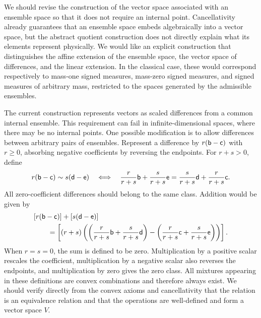 \ifdraft

\openproblembreak

{We should revise the construction of the vector space associated with an ensemble space so that it does not require an internal point. Cancellativity already guarantees that an ensemble space embeds algebraically into a vector space, but the abstract quotient construction does not directly explain what its elements represent physically. We would like an explicit construction that distinguishes the affine extension of the ensemble space, the vector space of differences, and the linear extension. In the classical case, these would correspond respectively to mass-one signed measures, mass-zero signed measures, and signed measures of arbitrary mass, restricted to the spaces generated by the admissible ensembles.}

The current construction represents vectors as scaled differences from a common internal ensemble. This requirement can fail in infinite-dimensional spaces, where there may be no internal points. One possible modification is to allow differences between arbitrary pairs of ensembles. Represent a difference by $r(\ens[b]-\ens[c])$ with $r\geq0$, absorbing negative coefficients by reversing the endpoints. For $r+s>0$, define
\[
r(\ens[b]-\ens[c])\sim s(\ens[d]-\ens[e])
\quad\Longleftrightarrow\quad
\frac{r}{r+s}\ens[b]+\frac{s}{r+s}\ens[e]
=
\frac{s}{r+s}\ens[d]+\frac{r}{r+s}\ens[c].
\]
All zero-coefficient differences should belong to the same class. Addition would be given by
\[
\begin{aligned}
	&[r(\ens[b]-\ens[c])]+[s(\ens[d]-\ens[e])]\\
	&\qquad=
	\left[(r+s)\left(
	\left(\frac{r}{r+s}\ens[b]+\frac{s}{r+s}\ens[d]\right)
	-
	\left(\frac{r}{r+s}\ens[c]+\frac{s}{r+s}\ens[e]\right)
	\right)\right].
\end{aligned}
\]
When $r=s=0$, the sum is defined to be zero. Multiplication by a positive scalar rescales the coefficient, multiplication by a negative scalar also reverses the endpoints, and multiplication by zero gives the zero class. All mixtures appearing in these definitions are convex combinations and therefore always exist. We should verify directly from the convex axioms and cancellativity that the relation is an equivalence relation and that the operations are well-defined and form a vector space $V$.

